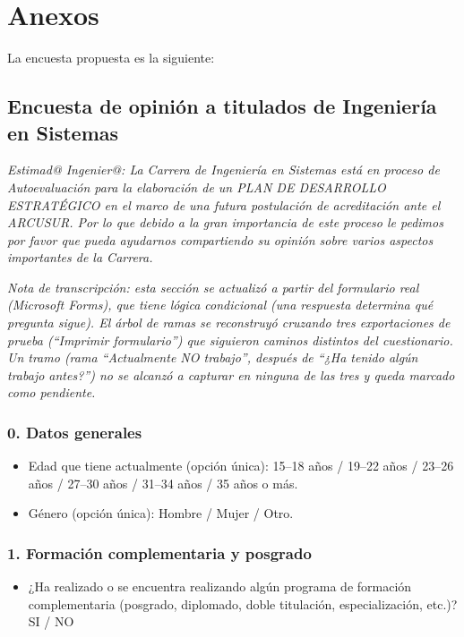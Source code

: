 \documentclass[12pt]{article}
\begin{document}
\section{Anexos}

La encuesta propuesta es la siguiente:

\subsection*{Encuesta de opinión a titulados de Ingeniería en Sistemas}

\textit{Estimad@ Ingenier@: La Carrera de Ingeniería en Sistemas está en
proceso de Autoevaluación para la elaboración de un PLAN DE DESARROLLO
ESTRATÉGICO en el marco de una futura postulación de acreditación ante el
ARCUSUR. Por lo que debido a la gran importancia de este proceso le
pedimos por favor que pueda ayudarnos compartiendo su opinión sobre varios
aspectos importantes de la Carrera.}

\textit{Nota de transcripción: esta sección se actualizó a partir del
formulario real (Microsoft Forms), que tiene lógica condicional (una
respuesta determina qué pregunta sigue). El árbol de ramas se reconstruyó
cruzando tres exportaciones de prueba (``Imprimir formulario'') que
siguieron caminos distintos del cuestionario. Un tramo (rama ``Actualmente
NO trabajo'', después de ``¿Ha tenido algún trabajo antes?'') no se alcanzó
a capturar en ninguna de las tres y queda marcado como pendiente.}

\subsubsection*{0. Datos generales}

\begin{itemize}[nosep]
    \item Edad que tiene actualmente (opción única): 15--18 años /
    19--22 años / 23--26 años / 27--30 años / 31--34 años / 35 años o más.
    \item Género (opción única): Hombre / Mujer / Otro.
\end{itemize}

\subsubsection*{1. Formación complementaria y posgrado}

\begin{itemize}[nosep]
    \item ¿Ha realizado o se encuentra realizando algún programa de
    formación complementaria (posgrado, diplomado, doble titulación,
    especialización, etc.)? SI / NO
\end{itemize}
\end{document}
